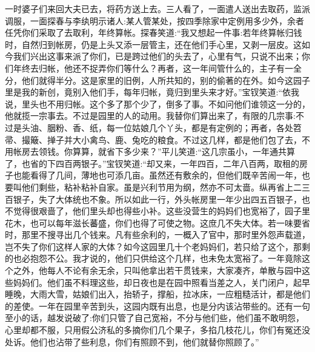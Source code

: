 \begin{parag}
    一时婆子们来回大夫已去，将药方送上去。三人看了，一面遣人送出去取药，监派调服，一面探春与李纨明示诸人:某人管某处，按四季除家中定例用多少外，余者任凭你们采取了去取利，年终算帐。探春笑道:“我又想起一件事:若年终算帐归钱时，自然归到帐房，仍是上头又添一层管主，还在他们手心里，又剥一层皮。这如今我们兴出这事来派了你们，已是跨过他们的头去了，心里有气，只说不出来；你们年终去归帐，他还不捉弄你们等什么？再者，这一年间管什么的，主子有一全分，他们就得半分。这是家里的旧例，人所共知的，别的偷著的在外。如今这园子里是我的新创，竟别入他们手，每年归帐，竟归到里头来才好。”宝钗笑道:“依我说，里头也不用归帐。这个多了那个少了，倒多了事。不如问他们谁领这一分的，他就揽一宗事去。不过是园里的人的动用。我替你们算出来了，有限的几宗事:不过是头油、胭粉、香、纸，每一位姑娘几个丫头，都是有定例的；再者，各处笤帚、撮簸、掸子并大小禽鸟、鹿、兔吃的粮食。不过这几样，都是他们包了去，不用帐房去领钱。你算算，就省下多少来？”平儿笑道:“这几宗虽小，一年通共算了，也省的下四百两银子。”宝钗笑道:“却又来，一年四百，二年八百两，取租的房子也能看得了几间，薄地也可添几亩。虽然还有敷余的，但他们既辛苦闹一年，也要叫他们剩些，粘补粘补自家。虽是兴利节用为纲，然亦不可太啬。纵再省上二三百银子，失了大体统也不象。所以如此一行，外头帐房里一年少出四五百银子，也不觉得很艰啬了，他们里头却也得些小补。这些没营生的妈妈们也宽裕了，园子里花木，也可以每年滋长蕃盛，你们也得了可使之物。这庶几不失大体。若一味要省时，那里不搜寻出几个钱来。凡有些余利的，一概入了官中，那时里外怨声载道，岂不失了你们这样人家的大体？如今这园里几十个老妈妈们，若只给了这个，那剩的也必抱怨不公。我才说的，他们只供给这个几样，也未免太宽裕了。一年竟除这个之外，他每人不论有余无余，只叫他拿出若干贯钱来，大家凑齐，单散与园中这些妈妈们。他们虽不料理这些，却日夜也是在园中照看当差之人，关门闭户，起早睡晚，大雨大雪，姑娘们出入，抬轿子，撑船，拉冰床，一应粗糙活计，都是他们的差使。一年在园里辛苦到头，这园内既有出息，也是分内该沾带些的。还有一句至小的话，越发说破了:你们只管了自己宽裕，不分与他们些，他们虽不敢明怨，心里却都不服，只用假公济私的多摘你们几个果子，多掐几枝花儿，你们有冤还没处诉。他们也沾带了些利息，你们有照顾不到，他们就替你照顾了。”
\end{parag}


